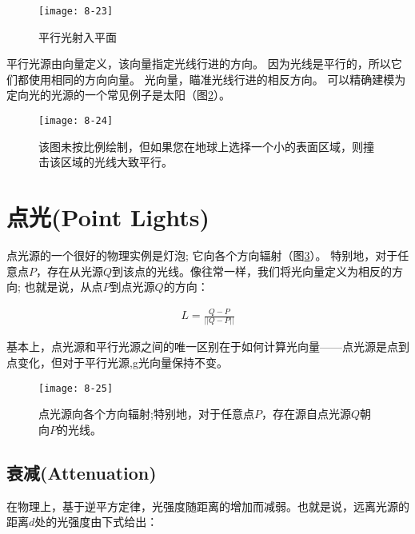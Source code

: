 \begin{figure}[h]
    \texttt{[image: 8-23]}
    \centering
    \caption{平行光射入平面}
    \label{fig:8-23}
\end{figure}

\begin{flushleft}
平行光源由向量定义，该向量指定光线行进的方向。 因为光线是平行的，所以它们都使用相同的方向向量。 光向量，瞄准光线行进的相反方向。 可以精确建模为定向光的光源的一个常见例子是太阳（图\ref{fig:8-24}）。
\end{flushleft}

\begin{figure}[h]
    \texttt{[image: 8-24]}
    \centering
    \caption{该图未按比例绘制，但如果您在地球上选择一个小的表面区域，则撞击该区域的光线大致平行。}
    \label{fig:8-24}
\end{figure}

\section{点光(Point Lights)}
\begin{flushleft}
点光源的一个很好的物理实例是灯泡; 它向各个方向辐射（图\ref{fig:8-25}）。 特别地，对于任意点$P$，存在从光源$Q$到该点的光线。像往常一样，我们将光向量定义为相反的方向; 也就是说，从点$P$到点光源$Q$的方向：\\
\end{flushleft}

\begin{align*}
L=\frac{Q-P}{||Q-P||}
\end{align*}

\begin{flushleft}
基本上，点光源和平行光源之间的唯一区别在于如何计算光向量——点光源是点到点变化，但对于平行光源,g光向量保持不变。
\end{flushleft}

\begin{figure}[h]
    \texttt{[image: 8-25]}
    \centering
    \caption{点光源向各个方向辐射;特别地，对于任意点$P$，存在源自点光源$Q$朝向$P$的光线。}
    \label{fig:8-25}
\end{figure}

\subsection{衰减(Attenuation)}
\begin{flushleft}
在物理上，基于逆平方定律，光强度随距离的增加而减弱。也就是说，远离光源的距离$d$处的光强度由下式给出：\\
\end{flushleft}

